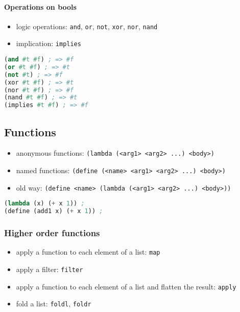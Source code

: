 \documentclass[a4paper,landscape,10pt]{article}
\begin{document}
\begin{multicols*}{2}
  \paragraph{Operations on bools}

  \begin{itemize}
    \item logic operations: \texttt{and}, \texttt{or}, \texttt{not}, \texttt{xor}, \texttt{nor}, \texttt{nand}
    \item implication: \texttt{implies}
  \end{itemize}

  \begin{lstlisting}[language=Scheme]
(and #t #f) ; => #f
(or #t #f) ; => #t
(not #t) ; => #f
(xor #t #f) ; => #t
(nor #t #f) ; => #f
(nand #t #f) ; => #t
(implies #t #f) ; => #f
\end{lstlisting}

  \subsection{Functions}

  \begin{itemize}
    \item anonymous functions: \texttt{(lambda (<arg1> <arg2> ...) <body>)}
    \item named functions: \texttt{(define (<name> <arg1> <arg2> ...) <body>)}
    \item old way: \texttt{(define <name> (lambda (<arg1> <arg2> ...) <body>))}
  \end{itemize}

  \begin{lstlisting}[language=Scheme]
(lambda (x) (+ x 1)) ;
(define (add1 x) (+ x 1)) ;
\end{lstlisting}

  \subsubsection{Higher order functions}

  \begin{itemize}
    \item apply a function to each element of a list: \texttt{map}
    \item apply a filter: \texttt{filter}
    \item apply a function to each element of a list and flatten the result: \texttt{apply}
    \item fold a list: \texttt{foldl}, \texttt{foldr}
  \end{itemize}


\end{multicols*}
\end{document}
